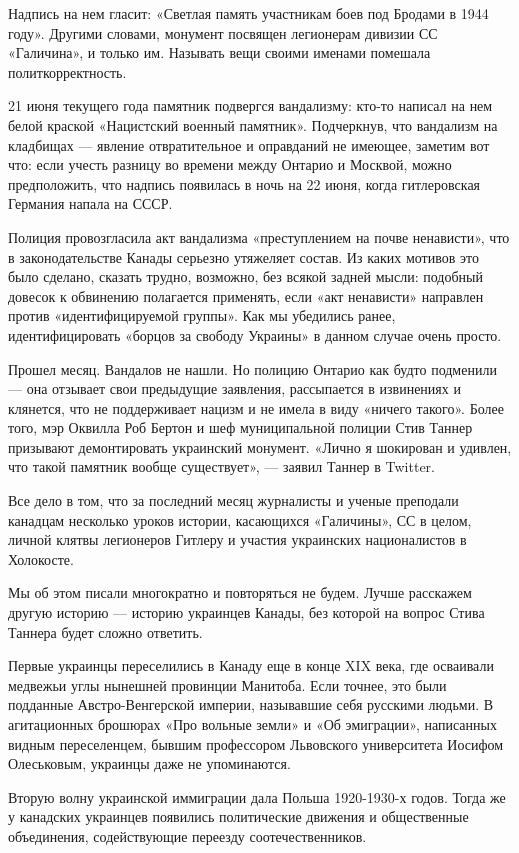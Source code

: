 \documentclass[a4paper,11pt]{extreport}
\begin{document}
Надпись на нем гласит: «Светлая память участникам боев под Бродами в 1944
году». Другими словами, монумент посвящен легионерам дивизии СС «Галичина», и
только им. Называть вещи своими именами помешала политкорректность.

21 июня текущего года памятник подвергся вандализму: кто-то написал на нем
белой краской «Нацистский военный памятник». Подчеркнув, что вандализм на
кладбищах --- явление отвратительное и оправданий не имеющее, заметим вот что:
если учесть разницу во времени между Онтарио и Москвой, можно предположить, что
надпись появилась в ночь на 22 июня, когда гитлеровская Германия напала на
СССР.

Полиция провозгласила акт вандализма «преступлением на почве ненависти», что в
законодательстве Канады серьезно утяжеляет состав. Из каких мотивов это было
сделано, сказать трудно, возможно, без всякой задней мысли: подобный довесок к
обвинению полагается применять, если «акт ненависти» направлен против
«идентифицируемой группы». Как мы убедились ранее, идентифицировать «борцов за
свободу Украины» в данном случае очень просто.

Прошел месяц. Вандалов не нашли. Но полицию Онтарио как будто подменили --- она
отзывает свои предыдущие заявления, рассыпается в извинениях и клянется, что не
поддерживает нацизм и не имела в виду «ничего такого». Более того, мэр Оквилла
Роб Бертон и шеф муниципальной полиции Стив Таннер призывают демонтировать
украинский монумент. «Лично я шокирован и удивлен, что такой памятник вообще
существует», --- заявил Таннер в Twitter.

Все дело в том, что за последний месяц журналисты и ученые преподали канадцам
несколько уроков истории, касающихся «Галичины», СС в целом, личной клятвы
легионеров Гитлеру и участия украинских националистов в Холокосте.

Мы об этом писали многократно и повторяться не будем. Лучше расскажем другую
историю --- историю украинцев Канады, без которой на вопрос Стива Таннера будет
сложно ответить.

Первые украинцы переселились в Канаду еще в конце XIX века, где осваивали
медвежьи углы нынешней провинции Манитоба. Если точнее, это были подданные
Австро-Венгерской империи, называвшие себя русскими людьми. В агитационных
брошюрах «Про вольные земли» и «Об эмиграции», написанных видным переселенцем,
бывшим профессором Львовского университета Иосифом Олеськовым, украинцы даже не
упоминаются.

Вторую волну украинской иммиграции дала Польша 1920-1930-х годов. Тогда же у
канадских украинцев появились политические движения и общественные объединения,
содействующие переезду соотечественников.
\end{document}
